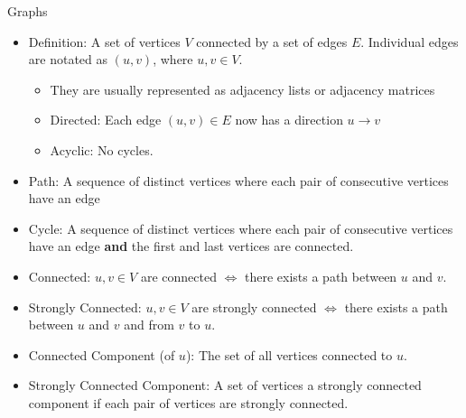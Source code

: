 \documentclass{beamer}
\begin{document}
\begin{frame}[t]{Graphs}
  \begin{itemize}
      \item \alert{Definition:} A set of vertices $V$ connected by a set of edges $E$. Individual edges are notated as $(u, v)$, where $u, v \in V$.
      \begin{itemize}
          \item They are usually represented as \alert{adjacency lists} or \alert{adjacency matrices} \pause
          \item \alert{Directed:} Each edge $(u, v) \in E$ now has a direction $u \to v$ \pause
          \item \alert{Acyclic:} No cycles. \pause
      \end{itemize}
      \item \alert{Path:} A sequence of distinct vertices where each pair of consecutive vertices have an edge \pause
      \item \alert{Cycle:} A sequence of distinct vertices where each pair of consecutive vertices have an edge \textbf{and} the first and last vertices are connected. \pause
      \item \alert{Connected:} $u, v \in V$ are connected $\iff$ there exists a path between $u$ and $v$. \pause
      \item \alert{Strongly Connected:} $u, v \in V$ are strongly connected $\iff$ there exists a path between $u$ and $v$ and from $v$ to $u$. \pause
      
      \item \alert{Connected Component (of $u$):} The set of all vertices connected to $u$. \pause
      \item \alert{Strongly Connected Component:} A set of vertices a strongly connected component if each pair of vertices are strongly connected. \pause
      
  \end{itemize}
\end{frame}
\end{document}

